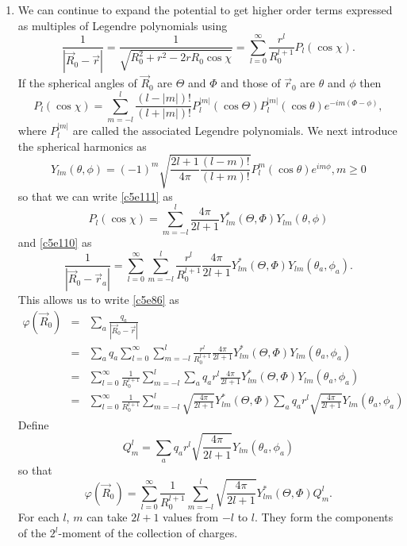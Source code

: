 \begin{enumerate}
\item We can continue to expand the potential to get higher order terms 
expressed as multiples of Legendre polynomials using
\begin{equation}\label{c5e110}
\frac{1}{|\vec{R}_0 - \vec{r}|} = \frac{1}{\sqrt{R_0^2 + r^2 - 2rR_0\cos\chi}}
= \sum_{l=0}^\infty \frac{r^l}{R_0^{l+1}}P_l(\cos\chi).
\end{equation}
If the spherical angles of $\vec{R}_0$ are $\Theta$ and $\Phi$ and those of
$\vec{r}_0$ are $\theta$ and $\phi$ then
\begin{equation}\label{c5e111}
P_l(\cos\chi) = \sum_{m=-l}^l\frac{(l -|m|)!}{(l + |m|)!}
P_l^{|m|}(\cos\Theta)P_l^{|m|}(\cos\theta)e^{-im(\Phi-\phi)},
\end{equation}
where $P_l^{|m|}$ are called the associated Legendre polynomials. We next 
introduce the spherical harmonics as
\begin{equation}\label{c5e112}
Y_{lm}(\theta,\phi)=(-1)^m\sqrt{\frac{2l+1}{4\pi}\frac{(l-m)!}{(l+m)!}}
P_l^m(\cos\theta)e^{im\phi}, m \ge 0
\end{equation}
so that we can write \eqref{c5e111} as
\begin{equation}\label{c5e113}
P_l(\cos\chi)=
\sum_{m=-l}^l\frac{4\pi}{2l+1}Y_{lm}^\ast(\Theta,\Phi)Y_{lm}(\theta,\phi)
\end{equation}
and \eqref{c5e110} as
\begin{equation}\label{c5e114}
\frac{1}{|\vec{R}_0 - \vec{r}_a|} = 
\sum_{l=0}^\infty\sum_{m=-l}^l\frac{r^l}{R_0^{l+1}}
\frac{4\pi}{2l+1}Y_{lm}^\ast(\Theta,\Phi)Y_{lm}(\theta_a,\phi_a).
\end{equation}
This allows us to write \eqref{c5e86} as
\begin{eqnarray*}
\varphi(\vec{R}_0) &=& \sum_a\frac{q_a}{|\vec{R}_0 - \vec{r}|} \\
 &=& \sum_a q_a\sum_{l=0}^\infty\sum_{m=-l}^l
 	\frac{r^l}{R_0^{l+1}}\frac{4\pi}{2l+1}Y_{lm}^\ast(\Theta,\Phi)
     Y_{lm}(\theta_a,\phi_a) \\
 &=& \sum_{l=0}^\infty\frac{1}{R_0^{l+1}}\sum_{m=-l}^l\sum_a 
 	q_ar^l\frac{4\pi}{2l+1}Y_{lm}^\ast(\Theta,\Phi)
     Y_{lm}(\theta_a,\phi_a) \\
 &=& \sum_{l=0}^\infty\frac{1}{R_0^{l+1}}\sum_{m=-l}^l
 	\sqrt{\frac{4\pi}{2l+1}}Y_{lm}^\ast(\Theta,\Phi)
     \sum_a q_ar^l\sqrt{\frac{4\pi}{2l+1}}Y_{lm}(\theta_a,\phi_a)
\end{eqnarray*}
Define
\begin{equation}\label{c5e115}
Q_m^l = \sum_a q_ar^l\sqrt{\frac{4\pi}{2l+1}}Y_{lm}(\theta_a,\phi_a)
\end{equation}
so that
\begin{equation}\label{c5e116}
\varphi(\vec{R}_0) = \sum_{l=0}^\infty\frac{1}{R_0^{l+1}}\sum_{m=-l}^l
\sqrt{\frac{4\pi}{2l+1}} Y_{lm}^\ast(\Theta,\Phi)Q_m^l.
\end{equation}
For each $l$, $m$ can take $2l + 1$ values from $-l$ to $l$. They form the 
components of the $2^l$-moment of the collection of charges.


\end{enumerate}
